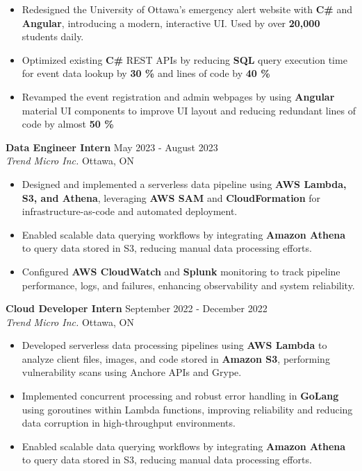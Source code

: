 \documentclass[a4paper]{article}
\begin{document}
\vspace{-2mm}
\begin{itemize} \itemsep -2pt
    \item Redesigned the University of Ottawa's emergency alert website with \textbf{C\#} and \textbf{Angular}, introducing a modern, interactive UI. Used by over \textbf{20,000} students daily.
     \item Optimized existing \textbf{C\#} REST APIs by reducing \textbf{SQL} query execution time for event data lookup by \textbf{30 \%} and lines of code by \textbf{40 \%}
    \item Revamped the event registration and admin webpages by using \textbf{Angular} material UI components to improve UI layout and reducing redundant lines of code by almost \textbf{50 \%}
\end{itemize}
\textbf{Data Engineer Intern} \hfill May 2023 - August 2023\\
\textit{Trend Micro Inc.} \hfill Ottawa, ON\\
\vspace{-2mm}
\begin{itemize} \itemsep -2pt
\item Designed and implemented a serverless data pipeline using \textbf{AWS Lambda, S3, and Athena}, leveraging \textbf{AWS SAM} and \textbf{CloudFormation} for infrastructure-as-code and automated deployment.
\item Enabled scalable data querying workflows by integrating \textbf{Amazon Athena} to query data stored in S3, reducing manual data processing efforts.
\item Configured \textbf{AWS CloudWatch} and \textbf{Splunk} monitoring to track pipeline performance, logs, and failures, enhancing observability and system reliability.
\end{itemize}
\textbf{Cloud Developer Intern} \hfill September 2022 - December 2022\\
\textit{Trend Micro Inc.} \hfill Ottawa, ON\\
\vspace{-2mm}
\begin{itemize} \itemsep -2pt
\item Developed serverless data processing pipelines using \textbf{AWS Lambda} to analyze client files, images, and code stored in \textbf{Amazon S3}, performing vulnerability scans using Anchore APIs and Grype.
\item Implemented concurrent processing and robust error handling in \textbf{GoLang} using goroutines within Lambda functions, improving reliability and reducing data corruption in high-throughput environments.
\item Enabled scalable data querying workflows by integrating \textbf{Amazon Athena} to query data stored in S3, reducing manual data processing efforts.
\end{itemize}
\end{document}
